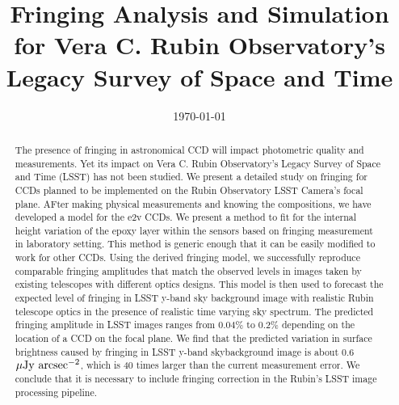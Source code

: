 \documentclass[twocolumn]{aastex63} %
\date{\today}
\newcommand{\ujyac}{$\mu\rm{Jy}\ \rm{arcsec}^{-2}$}
\begin{document}
\begin{CJK*}{UTF8}{gbsn}
\title{Fringing Analysis and Simulation for Vera C. Rubin Observatory's Legacy Survey of Space and Time} 



\begin{abstract}
The presence of fringing in astronomical CCD will impact photometric quality and measurements. Yet its impact on Vera C. Rubin Observatory's Legacy Survey of Space and Time (LSST) has not been studied. We present a detailed study on fringing for CCDs planned to be implemented on the Rubin Observatory LSST Camera's focal plane. AFter making physical measurements and knowing the compositions, we have developed a model for the e2v CCDs. We present a method to fit for the internal height variation of the epoxy layer within the sensors based on fringing measurement in laboratory setting. This method is generic enough that it can be easily modified to work for other CCDs. Using the derived fringing model, we successfully reproduce comparable fringing amplitudes that match the observed levels in images taken by existing telescopes with different optics designs. This model is then used to forecast the expected level of fringing in LSST y-band sky background image with realistic Rubin telescope optics in the presence of realistic time varying sky spectrum. The predicted fringing amplitude in LSST images ranges from $0.04\%$ to $0.2\%$ depending on the location of a CCD on the focal plane. We find that the predicted variation in surface brightness caused by fringing in LSST y-band skybackground image is about $0.6$ \ujyac, which is 40 times larger than the current measurement error. We conclude that it is necessary to include fringing correction in the Rubin's LSST image processing pipeline.
\end{abstract}


\end{CJK*}
\end{document}
